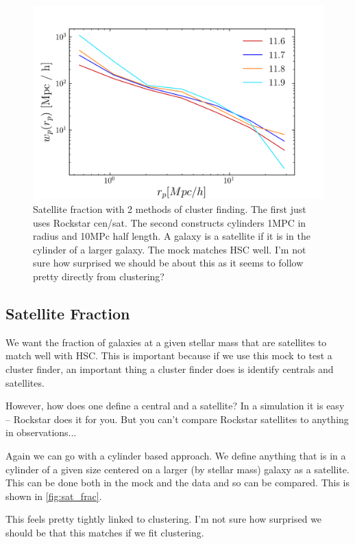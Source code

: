\documentclass{article}
\begin{document}
\begin{figure}[h]
    \includegraphics[width=\textwidth]{images/2pcf.png}
    \caption{Satellite fraction with 2 methods of cluster finding. The first just uses Rockstar cen/sat. The second constructs cylinders 1MPC in radius and 10MPc half length. A galaxy is a satellite if it is in the cylinder of a larger galaxy. The mock matches HSC well.
        I'm not sure how surprised we should be about this as it seems to follow pretty directly from clustering?
    \label{fig:2pcf}
}
\end{figure}

\subsection{Satellite Fraction}

We want the fraction of galaxies at a given stellar mass that are satellites to match well with HSC. This is important because if we use this mock to test a cluster finder, an important thing a cluster finder does is identify centrals and satellites.

However, how does one define a central and a satellite? In a simulation it is easy -- Rockstar does it for you. But you can't compare Rockstar satellites to anything in observations...

Again we can go with a cylinder based approach. We define anything that is in a cylinder of a given size centered on a larger (by stellar mass) galaxy as a satellite. This can be done both in the mock and the data and so can be compared. This is shown in \autoref{fig:sat_frac}.

This feels pretty tightly linked to clustering. I'm not sure how surprised we should be that this matches if we fit clustering.
\end{document}
